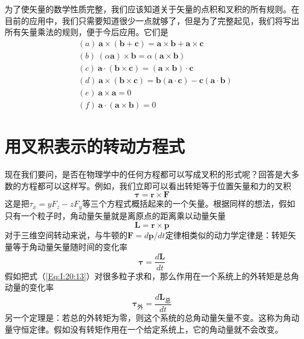 为了使矢量的数学性质完整，我们应该知道关于矢量的点积和叉积的所有规则。在目前的应用中，我们只需要知道很少一点就够了，但是为了完整起见，我们将写出所有矢量乘法的规则，便于今后应用。它们是
\begin{equation}
    \label{Eq:I:20:10}
    \begin{aligned}
        &(a)~\boldsymbol{a} \times (\boldsymbol{b} + \boldsymbol{c}) = \boldsymbol{a} \times \boldsymbol{b} + \boldsymbol{a} \times \boldsymbol{c} \\
        &(b)~(\alpha \boldsymbol{a}) \times \boldsymbol{b} = \alpha (\boldsymbol{a} \times \boldsymbol{b}) \\
        &(c)~\boldsymbol{a} \cdot (\boldsymbol{b} \times \boldsymbol{c}) = (\boldsymbol{a} \times \boldsymbol{b}) \cdot \boldsymbol{c} \\ 
        &(d)~\boldsymbol{a} \times (\boldsymbol{b} \times \boldsymbol{c}) = \boldsymbol{b}(\boldsymbol{a} \cdot \boldsymbol{c}) - \boldsymbol{c} (\boldsymbol{a} \cdot \boldsymbol{b}) \\
        &(e)~\boldsymbol{a} \times \boldsymbol{a} = 0 \\
        &(f)~\boldsymbol{a} \cdot (\boldsymbol{a} \times \boldsymbol{b}) = 0
    \end{aligned}
\end{equation}

\section{用叉积表示的转动方程式}

现在我们要问，是否在物理学中的任何方程都可以写成叉积的形式呢？回答是大多数的方程都可以这样写。例如，我们立即可以看出转矩等于位置矢量和力的叉积
\begin{equation}
    \label{Eq:I:20:11}
    \boldsymbol{\tau} = \boldsymbol{r} \times \boldsymbol{F}
\end{equation}
这是把$\tau_x=yF_z-zF_y$等三个方程式概括起来的一个矢量。根据同样的想法，假如只有一个粒子时，角动量矢量就是离原点的距离乘以动量矢量
\begin{equation}
    \label{Eq:I:20:12}
    \boldsymbol{L} = \boldsymbol{r} \times \boldsymbol{p}
\end{equation}
对于三维空间转动来说，与牛顿的$\boldsymbol{F}=d\boldsymbol{p}/dt$定律相类似的动力学定律是：转矩矢量等于角动量矢量随时间的变化率
\begin{equation}
    \label{Eq:I:20:13}
    \boldsymbol{\tau} = \frac{d\boldsymbol{L}}{dt} 
\end{equation}
假如把式（\ref{Eq:I:20:13}）对很多粒子求和，那么作用在一个系统上的外转矩是总角动量的变化率
\begin{equation}
    \label{Eq:I:20:14}
    \boldsymbol{\tau_\text{外}} = \frac{d\boldsymbol{L}_\text{总}}{dt} 
\end{equation}
另一个定理是：若总的外转矩为零，则这个系统的总角动量矢量不变。这称为角动量守恒定律。假如没有转矩作用在一个给定系统上，它的角动量就不会改变。

